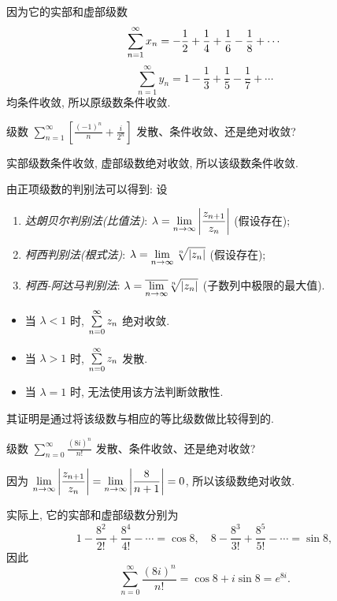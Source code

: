 \documentclass[nocolor,theme=doremi,lang=cn,11pt,chinese,twoside,openright,usesamecnt]{elegantbook}
\begin{document}
\begin{solution}
	因为它的实部和虚部级数
	\[\sum_{n=1}^\infty x_n=-\frac{1}{2} +\frac14+\frac16-\frac18+\cdots\]
{
	\[\sum_{n=1}^\infty y_n=1-\frac13+\frac15-\frac17+\cdots\]
	均条件收敛,
}{所以原级数条件收敛.}
\end{solution}

\begin{exercise}
	级数 $\displaystyle\sum_{n=1}^\infty\left[\frac{(-1)^n}n+\frac i{2^n}\right]$ 发散、条件收敛、还是绝对收敛?
\end{exercise}

\begin{answer}
	实部级数条件收敛, 虚部级数绝对收敛, 所以该级数条件收敛.
\end{answer}

由正项级数的判别法可以得到:
设
\begin{enumerate}
	\item \emph{达朗贝尔判别法(比值法)}: $\lambda=\displaystyle\lim_{n\to\infty}\left|\frac{z_{n+1}}{z_n}\right|$ (假设存在);
	\item \emph{柯西判别法(根式法)}: $\lambda=\displaystyle\lim_{n\to\infty}\sqrt[n]{\left|z_n\right|}$ (假设存在);
	\item \emph{柯西-阿达马判别法}: $\lambda=\displaystyle\overline{\lim_{n\to\infty}}\sqrt[n]{\left|z_n\right|}$ (子数列中极限的最大值).
\end{enumerate}

\begin{itemize}
	\item 当 $\lambda<1$ 时, $\sum\limits_{n=0}^\infty z_n$ 绝对收敛.
	\item 当 $\lambda>1$ 时, $\sum\limits_{n=0}^\infty z_n$ 发散.
	\item 当 $\lambda=1$ 时, 无法使用该方法判断敛散性.
\end{itemize}
其证明是通过将该级数与相应的等比级数做比较得到的.

\begin{example}
	级数 $\displaystyle\sum_{n=0}^\infty\frac{(8i)^n}{n!}$ 发散、条件收敛、还是绝对收敛?
\end{example}

\begin{solution}
	因为 $\displaystyle\lim_{n\to\infty}\left|\frac{z_{n+1}}{z_n}\right|=\lim_{n\to\infty}\left|\dfrac{8}{n+1}\right|=0$, 所以该级数绝对收敛.
\end{solution}

实际上, 它的实部和虚部级数分别为
\[1-\frac{8^2}{2!}+\frac{8^4}{4!}-\cdots=\cos 8,\quad
8-\frac{8^3}{3!}+\frac{8^5}{5!}-\cdots=\sin 8,\]
因此
\[\sum_{n=0}^\infty\frac{(8i)^n}{n!}=\cos 8+i\sin 8=e^{8i}.\]
\end{document}
